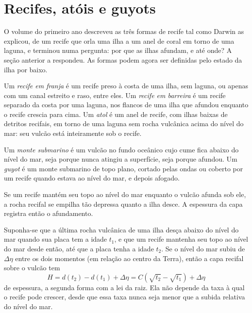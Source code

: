 \section{Recifes, atóis e guyots}\label{sec:b2:oceanic-islands:reefs}

O volume do primeiro ano descreveu as três formas de recife tal como Darwin as explicou, de um recife que orla
uma ilha a um anel de coral em torno de uma laguna, e terminou numa pergunta: por que as ilhas afundam,
e até onde? A seção anterior a respondeu. As formas podem agora ser definidas pelo estado da
ilha por baixo.

\begin{definition}\label{def:b2:oceanic-islands:reefs}
Um \emph{recife em franja} é um recife preso à costa de uma ilha, sem
laguna, ou apenas com um canal estreito e raso, entre eles. Um \emph{recife em barreira}
é um recife separado da costa por uma laguna, nos flancos de uma ilha que afundou enquanto o
recife crescia para cima. Um \emph{atol} é um anel de recife, com ilhas baixas de detritos recifais,
em torno de uma laguna sem rocha vulcânica acima do nível do mar: seu vulcão está inteiramente sob o recife.
\end{definition}

\begin{definition}\label{def:b2:oceanic-islands:seamount}
Um \emph{monte submarino} é um vulcão no fundo oceânico cujo cume fica abaixo do nível
do mar, seja porque nunca atingiu a superfície, seja porque afundou. Um
\emph{guyot} é um monte submarino de topo plano, cortado pelas ondas ou coberto por um recife quando
estava ao nível do mar, e depois afogado.
\end{definition}

Se um recife mantém seu topo ao nível do mar enquanto o vulcão afunda sob ele, a rocha recifal se empilha tão
depressa quanto a ilha desce. A espessura da capa registra então o afundamento.

\begin{proposition}\label{prop:b2:oceanic-islands:cap}
Suponha-se que a última rocha vulcânica de uma ilha desça abaixo do nível do mar quando sua placa tem a idade $t_1$, e que um
recife mantenha seu topo ao nível do mar desde então, até que a placa tenha a idade $t_2$. Se o nível do mar subiu
de $\Delta\eta$ entre os dois momentos (em relação ao centro da Terra), então a capa recifal
sobre o vulcão tem
\[
H = d(t_2) - d(t_1) + \Delta\eta = C\left(\sqrt{t_2} - \sqrt{t_1}\right) + \Delta\eta
\]
de espessura, a segunda forma com a lei da raiz. Ela não depende da taxa à qual o recife pode
crescer, desde que essa taxa nunca seja menor que a subida relativa do nível do mar.
\end{proposition}

